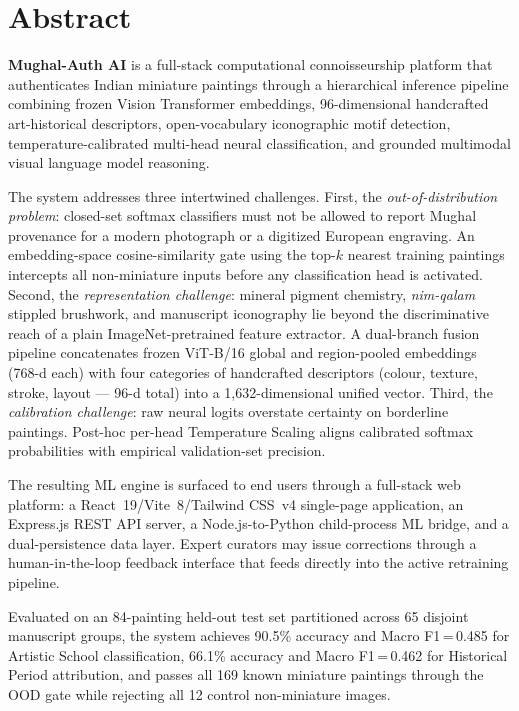 \documentclass[12pt, a4paper, twoside]{article}
\begin{document}
\setcounter{page}{1}

\clearpage
\section*{Abstract}

\textbf{Mughal-Auth AI} is a full-stack computational connoisseurship platform that authenticates Indian miniature paintings through a hierarchical inference pipeline combining frozen Vision Transformer embeddings, 96-dimensional handcrafted art-historical descriptors, open-vocabulary iconographic motif detection, temperature-calibrated multi-head neural classification, and grounded multimodal visual language model reasoning.

The system addresses three intertwined challenges. First, the \emph{out-of-distribution problem}: closed-set softmax classifiers must not be allowed to report Mughal provenance for a modern photograph or a digitized European engraving. An embedding-space cosine-similarity gate using the top-$k$ nearest training paintings intercepts all non-miniature inputs before any classification head is activated. Second, the \emph{representation challenge}: mineral pigment chemistry, \textit{nim-qalam} stippled brushwork, and manuscript iconography lie beyond the discriminative reach of a plain ImageNet-pretrained feature extractor. A dual-branch fusion pipeline concatenates frozen ViT-B/16 global and region-pooled embeddings (768-d each) with four categories of handcrafted descriptors (colour, texture, stroke, layout — 96-d total) into a 1,632-dimensional unified vector. Third, the \emph{calibration challenge}: raw neural logits overstate certainty on borderline paintings. Post-hoc per-head Temperature Scaling aligns calibrated softmax probabilities with empirical validation-set precision.

The resulting ML engine is surfaced to end users through a full-stack web platform: a React~19/Vite~8/Tailwind CSS~v4 single-page application, an Express.js REST API server, a Node.js-to-Python child-process ML bridge, and a dual-persistence data layer. Expert curators may issue corrections through a human-in-the-loop feedback interface that feeds directly into the active retraining pipeline.

Evaluated on an 84-painting held-out test set partitioned across 65 disjoint manuscript groups, the system achieves 90.5\% accuracy and Macro F1\,=\,0.485 for Artistic School classification, 66.1\% accuracy and Macro F1\,=\,0.462 for Historical Period attribution, and passes all 169 known miniature paintings through the OOD gate while rejecting all 12 control non-miniature images.
\end{document}
